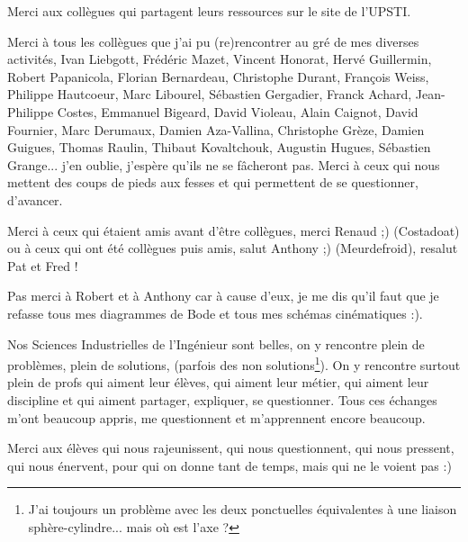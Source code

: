 Merci aux collègues qui partagent leurs ressources sur le site de l'UPSTI.

Merci à tous les collègues que j'ai pu (re)rencontrer au gré de mes diverses activités, Ivan Liebgott, Frédéric Mazet, Vincent Honorat, Hervé Guillermin, Robert Papanicola, Florian Bernardeau, Christophe Durant, François Weiss, Philippe Hautcoeur, Marc Libourel, Sébastien Gergadier, Franck Achard, Jean-Philippe Costes, Emmanuel Bigeard, David Violeau, Alain Caignot, David Fournier, Marc Derumaux, Damien Aza-Vallina, Christophe Grèze, Damien Guigues, Thomas Raulin, Thibaut Kovaltchouk, Augustin Hugues, Sébastien Grange... j'en oublie, j'espère qu'ils ne se fâcheront pas. Merci à ceux qui nous mettent des coups de pieds aux fesses et qui permettent de se questionner, d'avancer. 

Merci à ceux qui étaient amis avant d'être collègues, merci Renaud ;) (Costadoat) ou à ceux qui ont été collègues puis amis, salut Anthony ;) (Meurdefroid), resalut Pat et Fred !

Pas merci à Robert et à Anthony car à cause d'eux, je me dis qu'il faut que je refasse tous mes diagrammes de Bode et tous mes schémas cinématiques :).


Nos Sciences Industrielles de l'Ingénieur sont belles, on y rencontre plein de problèmes, plein de solutions,  (parfois des non solutions\footnote{J'ai toujours un problème avec les deux ponctuelles équivalentes à une liaison sphère-cylindre... mais où est l'axe ?}). 
On y rencontre surtout plein de profs qui aiment leur élèves, qui aiment leur métier, qui aiment leur discipline et qui aiment partager, expliquer, se questionner. Tous ces échanges m'ont beaucoup appris, me questionnent et m'apprennent encore beaucoup. 

Merci aux élèves qui nous rajeunissent, qui nous questionnent, qui nous pressent, qui nous énervent, pour qui on donne tant de temps, mais qui ne le voient pas :)

